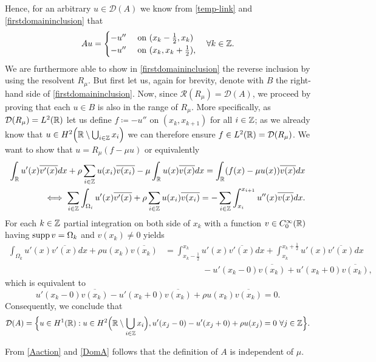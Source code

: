Hence, for an arbitrary $u \in \mathcal{D}(A)$ we know from \eqref{temp-link} and \eqref{firstdomaininclusion} that
	\begin{equation}
		A u = \begin{cases}
					- u'' & \text{ on } (x_{k} - \frac{1}{2}, x_{k}) \\
					- u'' & \text{ on } (x_{k}, x_{k} + \frac{1}{2}),
			 \end{cases} \quad \forall k \in \mathbb{Z}. \label{Aaction}
	\end{equation} 
We are furthermore able to show in \eqref{firstdomaininclusion} the reverse inclusion by using the resolvent $R_{\mu}$. But first let us, again for brevity, denote with $B$ the right-hand side of \eqref{firstdomaininclusion}. Now, since $\mathcal{R}(R_{\mu}) = \mathcal{D}(A)$, we proceed by proving that each $u \in B$ is also in the range of $R_{\mu}$. More specifically, as $\mathcal{D}(R_{\mu}) = L^{2}(\mathbb{R})$ let us define $f \coloneqq - u''$ on $(x_{k}, x_{k + 1})$ for all $i \in \mathbb{Z}$; as we already know that $u \in H^{2}\Big(\mathbb{R} \setminus \bigcup_{i \in \mathbb{Z}} x_{i} \Big)$ we can therefore ensure $f \in L^{2}(\mathbb{R}) = \mathcal{D}(R_{\mu})$. We want to show that $u = R_{\mu}(f - \mu u)$ or equivalently 
	\begin{align*}
		 \int_{\mathbb{R}} u'(x) \overline{v'(x)} dx + \rho \sum_{i \in \mathbb{Z}} u(x_{i}) \overline{v(x_{i})} - \mu \int_{\mathbb{R}} u(x) \overline{v(x)} dx = \int_{\mathbb{R}}(f(x)-\mu u(x)) \overline{v(x)} dx \\
		\iff \sum_{i \in \mathbb{Z}} \int_{\Omega_{i}} u'(x) \overline{v'(x)} + \rho \sum_{i \in \mathbb{Z}} u(x_{i}) \overline{v(x_{i})} = - \sum_{i \in \mathbb{Z}} \int_{x_{i}}^{x_{i+1}} u''(x) \overline{v(x)} dx.
	\end{align*}
For each $k \in \mathbb{Z}$ partial integration on both side of $x_{k}$ with a function $v \in C_{0}^{\infty}(\mathbb{R})$ having $\operatorname{supp} v = \Omega_{k}$ and $v(x_{k}) \neq 0$ yields
	\begin{align*}
		\int_{\Omega_{k}} u'(x) \overline{v'(x)} dx + \rho u(x_{k}) \overline{v(x_{k})} & = \int_{x_{k} - \frac{1}{2}}^{x_{k}} u'(x) \overline{v'(x)} dx + \int_{x_{k}}^{x_{k} +\frac{1}{2}} u'(x) \overline{v'(x)} dx \\
		& ~\qquad ~\qquad - u'(x_{k}-0) \overline{v(x_{k})}  + u'(x_{k}+0) \overline{v(x_{k})},
	\end{align*}
which is equivalent to
	\[ u'(x_{k}-0)\overline{v(x_{k})} - u'(x_{k}+0)\overline{v(x_{k})} + \rho u(x_{k})\overline{v(x_{k})} = 0. \]
Consequently, we conclude that
	\begin{equation}
		\mathcal{D}(A) = \Big\{ u \in H^{1}(\mathbb{R}): u \in H^{2}\Big(\mathbb{R} \setminus \bigcup_{i \in \mathbb{Z}} x_{i} \Big), u'(x_{j} - 0) - u'(x_{j} + 0) + \rho u(x_{j}) = 0 ~\forall j \in \mathbb{Z} \Big\}. \label{DomA}
	\end{equation}
\begin{remark}
	From \eqref{Aaction} and \eqref{DomA} follows that the definition of $A$ is independent of $\mu$.
\end{remark}

